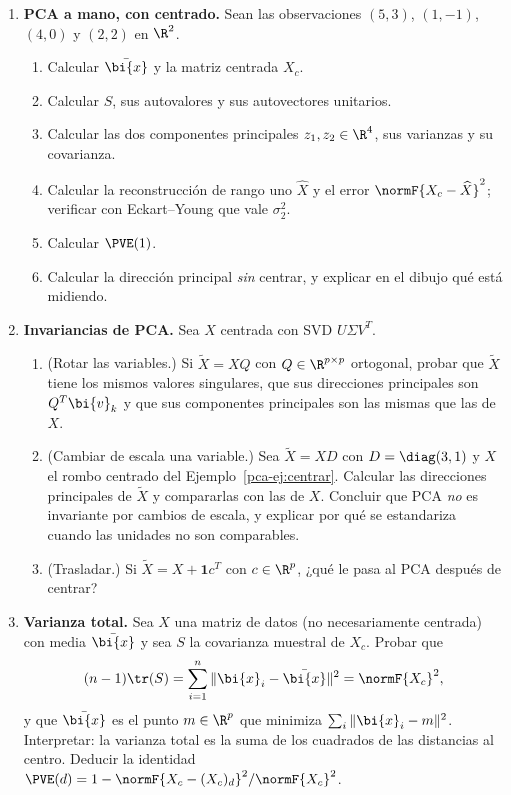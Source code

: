 \begin{enumerate}[leftmargin=*,label=\textbf{\thechapter.\arabic*},ref=\thechapter.\arabic*,itemsep=4pt]
\item {} \textbf{PCA a mano, con centrado.} Sean las
observaciones $(5,3)$, $(1,-1)$, $(4,0)$ y $(2,2)$ en $\R^2$.
\begin{enumerate}[label=(\alph*)]
\item Calcular $\bar{\bi{x}}$ y la matriz centrada $X_c$.
\item Calcular $S$, sus autovalores y sus autovectores unitarios.
\item Calcular las dos componentes principales $z_1,z_2\in\R^4$, sus
varianzas y su covarianza.
\item Calcular la reconstrucción de rango uno $\widehat X$ y el error
$\normF{X_c-\widehat X}^2$; verificar con Eckart--Young que vale $\sigma_2^2$.
\item Calcular $\PVE(1)$.
\item Calcular la dirección principal \emph{sin} centrar, y explicar en el
dibujo qué está midiendo.
\end{enumerate}

\item {} \textbf{Invariancias de PCA.}\label{pca-ej:rotacion-datos}
Sea $X$ centrada con SVD $U\Sigma V^T$.
\begin{enumerate}[label=(\alph*)]
\item (Rotar las variables.) Si $\widetilde X=XQ$ con $Q\in\R^{p\times p}$
ortogonal, probar que $\widetilde X$ tiene los mismos valores singulares, que
sus direcciones principales son $Q^T \bi{v}_k$ y que sus componentes
principales son las mismas que las de $X$.
\item (Cambiar de escala una variable.) Sea $\widetilde X=XD$ con
$D=\diag(3,1)$ y $X$ el rombo centrado del Ejemplo~\ref{pca-ej:centrar}. Calcular
las direcciones principales de $\widetilde X$ y compararlas con las de $X$.
Concluir que PCA \emph{no} es invariante por cambios de escala, y explicar por
qué se estandariza cuando las unidades no son comparables.
\item (Trasladar.) Si $\widetilde X=X+\mathbf 1c^T$ con $c\in\R^p$, ¿qué
le pasa al PCA después de centrar?
\end{enumerate}

\item {} \textbf{Varianza total.} Sea $X$ una matriz de datos
(no necesariamente centrada) con media $\bar{\bi{x}}$ y sea $S$ la covarianza
muestral de $X_c$. Probar que
\[
(n-1)\tr(S)=\sum_{i=1}^n\|\bi{x}_i-\bar{\bi{x}}\|^2=\normF{X_c}^2 ,
\]
y que $\bar{\bi{x}}$ es el punto $m\in\R^p$ que minimiza $\sum_i\|\bi{x}_i-m\|^2$.
Interpretar: la varianza total es la suma de los cuadrados de las distancias
al centro. Deducir la identidad
$\PVE(d)=1-\normF{X_c-(X_c)_d}^2/\normF{X_c}^2$.


\end{enumerate}
